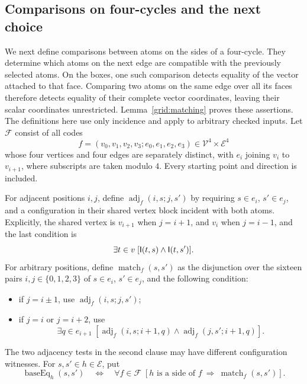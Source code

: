 \subsection{Comparisons on four-cycles and the next choice}

We next define comparisons between atoms on the sides of a four-cycle.
They determine which atoms on the next edge are compatible with the
previously selected atoms. On the boxes, one such comparison detects
equality of the vector attached to that face. Comparing two atoms on the
same edge over all its faces therefore detects equality of their complete
vector coordinates, leaving their scalar coordinates unrestricted.
Lemma~\ref{grid:matching} proves these assertions. The definitions here
use only incidence and apply to arbitrary checked inputs.
Let \(\mathcal F\) consist of all
codes
\[
 f=(v_0,v_1,v_2,v_3;e_0,e_1,e_2,e_3)
 \in\mathcal V^4\times\mathcal E^4
\]
whose four vertices and four edges are separately distinct, with \(e_i\)
joining \(v_i\) to \(v_{i+1}\), where subscripts are taken modulo \(4\).
Every starting point and direction is included.

For adjacent positions \(i,j\), define
\(\operatorname{adj}_f(i,s;j,s')\) by requiring \(s\in e_i\),
\(s'\in e_j\), and a configuration in their shared vertex block incident
with both atoms. Explicitly, the shared vertex is \(v_{i+1}\) when
\(j=i+1\), and \(v_i\) when \(j=i-1\), and the last condition is
\[
 \exists t\in v\;[\mathsf I(t,s)\land\mathsf I(t,s')].
\]
For arbitrary positions, define \(\operatorname{match}_f(s,s')\) as the
disjunction over the sixteen pairs \(i,j\in\{0,1,2,3\}\) of \(s\in e_i\),
\(s'\in e_j\), and the following condition:
\begin{itemize}
 \item if \(j=i\pm1\), use
       \(\operatorname{adj}_f(i,s;j,s')\);
 \item if \(j=i\) or \(j=i+2\), use
       \[
       \exists q\in e_{i+1}\;
       [\operatorname{adj}_f(i,s;i+1,q)\land
        \operatorname{adj}_f(j,s';i+1,q)].
       \]
\end{itemize}
The two adjacency tests in the second clause may have different
configuration witnesses. For \(s,s'\in h\in\mathcal E\), put
\begin{equation}
 \operatorname{baseEq}_h(s,s')
 \quad\Longleftrightarrow\quad
 \forall f\in\mathcal F\;
 [h\text{ is a side of }f\ \Longrightarrow\
       \operatorname{match}_f(s,s')].
 \label{sen:base-equality}
\end{equation}

